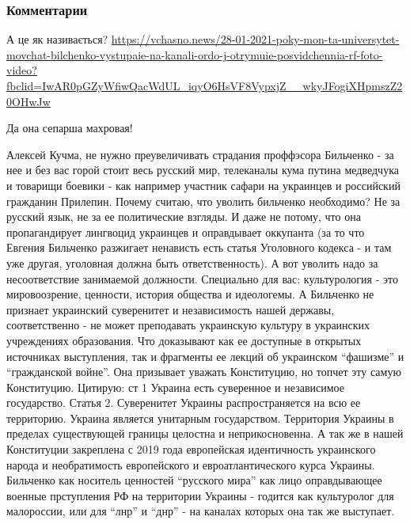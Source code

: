  
 
 
 
 
\subsubsection{Комментарии}

\begin{itemize}


А це як називається? 
\url{https://vchasno.news/28-01-2021-poky-mon-ta-universytet-movchat-bilchenko-vystupaie-na-kanali-ordo-j-otrymuie-posvidchennia-rf-foto-video?fbclid=IwAR0pGZyWfiwQacWdUL_iqyO6HsVF8VypxjZ__wkyJFogiXHpmszZ20OHwJw}


Да она сепарша махровая!


Алексей Кучма, не нужно преувеличивать страдания проффэсора Бильченко - за нее
и без вас горой стоит весь русский мир, телеканалы кума путина медведчука и
товарищи боевики - как например участник сафари на украинцев и российский
гражданин Прилепин. Почему считаю, что уволить бильченко необходимо? Не за
русский язык, не за ее политические взгляды. И даже не потому, что она
пропагандирует лингвоцид украинцев и оправдывает оккупанта (за то что Евгения
Бильченко разжигает ненависть есть статья Уголовного кодекса - и там уже
другая, уголовная должна быть ответственность). А вот уволить надо за
несоответствие занимаемой должности. Специально для вас: культурология - это
мировоозрение, ценности, история общества и идеологемы. А Бильченко не признает
украинский суверенитет и независимость нашей державы, соответственно - не может
преподавать украинскую культуру в украинских учреждениях образования. Что
доказывают как ее доступные в открытых источниках выступления, так и фрагменты
ее лекций об украинском \enquote{фашизме} и \enquote{гражданской войне}. Она призывает уважать
Конституцию, но топчет эту самую Конституцию. Цитирую: ст 1 Украина есть
суверенное и независимое государство. Статья 2. Суверенитет Украины
распространяется на всю ее территорию. Украина является унитарным государством.
Территория Украины в пределах существующей границы целостна и неприкосновенна.
А так же в нашей Конституции закреплена с 2019 года европейская идентичность
украинского народа и необратимость европейского и евроатлантического курса
Украины. Бильченко как носитель ценностей \enquote{русского мира} как лицо
оправдывающее военные прступления РФ на территории Украины - годится как
культуролог для малороссии, или для \enquote{лнр} и \enquote{днр} - на каналах которых она так
же выступает.


\end{itemize}
